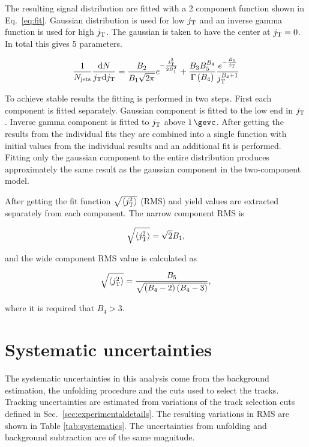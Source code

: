 The resulting signal distribution are fitted with a 2 component function shown in Eq.~\ref{eq:fit}. Gaussian distribution is used for low $j_{\rm T}$ and an inverse gamma function is used for high $j_{\rm T}$. The gaussian is taken to have the center at $j_{\rm T} = 0$. In total this gives 5 parameters.

\begin{equation}
\frac{1}{N_{\mathrm{jets}}}\frac{\mathrm{d}N}{j_{\rm T} \mathrm{d}j_{\rm T}} = \frac{B_2}{B_1\sqrt{2\pi}}e^{-\frac{j_{\rm T}^2}{2B_1^2}}+\frac{B_3B_5^{B_4}}{\Gamma\left(B_4\right)}\frac{e^{-\frac{B_5}{j_{\rm T}}}}{j_{\rm T}^{B_4+1}}
\label{eq:fit}
\end{equation}

To achieve stable results the fitting is performed in two steps. First each component is fitted separately. Gaussian component is fitted to the low end in $j_{\rm T}$. Inverse gamma component is fitted to $j_{\rm T}$ above $\unit[1]{\gevc}$. After getting the results from the individual fits they are combined into a single function with initial values from the individual results and an additional fit is performed. Fitting only the gaussian component to the entire distribution produces approximately the same result as the gaussian component in the two-component model.

After getting the fit function $\sqrt{\left<j_{\rm T}^2\right>}$ (RMS) and yield values are  extracted separately from each component. The narrow component RMS is

$$\sqrt{\left<j_{\rm T}^2\right>}=\sqrt{2}B_1,$$

and the wide component RMS value is calculated as 

$$\sqrt{\left<j_{\rm T}^2\right>}=\frac{B_5}{\sqrt{\left(B_4-2\right)\left(B_4-3\right)}},$$

where it is required that $B_4 > 3$.

\section{Systematic uncertainties}
\label{sec:systematicerrors}
The systematic uncertainties in this analysis come from the background estimation, the unfolding procedure and the cuts used to select the tracks. Tracking uncertainties are estimated from variations of the track selection cuts defined in Sec.~\ref{sec:experimentaldetails}. The resulting variations in RMS are shown in Table \ref{tab:systematics}. The uncertainties from unfolding and background subtraction are of the same magnitude. 

